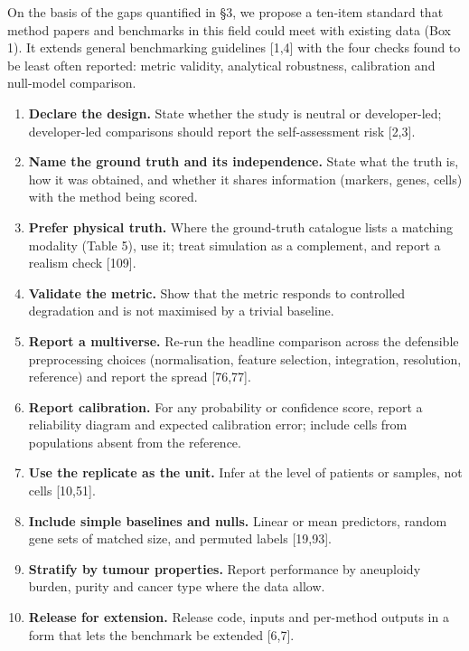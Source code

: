 \documentclass[11pt]{article}
\providecommand{\tightlist}{\setlength{\itemsep}{0pt}\setlength{\parskip}{0pt}}
\begin{document}
On the basis of the gaps quantified in §3, we propose a ten-item
standard that method papers and benchmarks in this field could meet with
existing data (Box 1). It extends general benchmarking guidelines
{[}1,4{]} with the four checks found to be least often reported: metric
validity, analytical robustness, calibration and null-model comparison.

\begin{tcolorbox}[enhanced,breakable,colback=gray!5,colframe=gray!55,boxrule=0.6pt,arc=2pt,left=8pt,right=8pt,top=6pt,bottom=6pt,fonttitle=\bfseries,coltitle=black,colbacktitle=gray!18,title={Box 1. Minimum evaluation standard for single-cell cancer methods}]\small

\begin{enumerate}
\def\labelenumi{\arabic{enumi}.}
\tightlist
\item
  \textbf{Declare the design.} State whether the study is neutral or
  developer-led; developer-led comparisons should report the
  self-assessment risk {[}2,3{]}.
\item
  \textbf{Name the ground truth and its independence.} State what the
  truth is, how it was obtained, and whether it shares information
  (markers, genes, cells) with the method being scored.
\item
  \textbf{Prefer physical truth.} Where the ground-truth catalogue lists
  a matching modality (Table 5), use it; treat simulation as a
  complement, and report a realism check {[}109{]}.
\item
  \textbf{Validate the metric.} Show that the metric responds to
  controlled degradation and is not maximised by a trivial baseline.
\item
  \textbf{Report a multiverse.} Re-run the headline comparison across
  the defensible preprocessing choices (normalisation, feature
  selection, integration, resolution, reference) and report the spread
  {[}76,77{]}.
\item
  \textbf{Report calibration.} For any probability or confidence score,
  report a reliability diagram and expected calibration error; include
  cells from populations absent from the reference.
\item
  \textbf{Use the replicate as the unit.} Infer at the level of patients
  or samples, not cells {[}10,51{]}.
\item
  \textbf{Include simple baselines and nulls.} Linear or mean
  predictors, random gene sets of matched size, and permuted labels
  {[}19,93{]}.
\item
  \textbf{Stratify by tumour properties.} Report performance by
  aneuploidy burden, purity and cancer type where the data allow.
\item
  \textbf{Release for extension.} Release code, inputs and per-method
  outputs in a form that lets the benchmark be extended {[}6,7{]}.
\end{enumerate}
\end{tcolorbox}
\end{document}
